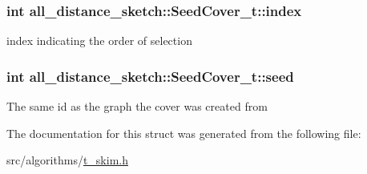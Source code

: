 \subsubsection[{index}]{\setlength{\rightskip}{0pt plus 5cm}int all\+\_\+distance\+\_\+sketch\+::\+Seed\+Cover\+\_\+t\+::index}\label{structall__distance__sketch_1_1SeedCover__t_ac11aa27c1be296bb17310c16790f88f5}
index indicating the order of selection \hypertarget{structall__distance__sketch_1_1SeedCover__t_af8100e6ff9b3830e0b40e395cbaeff4b}{}
\subsubsection[{seed}]{\setlength{\rightskip}{0pt plus 5cm}int all\+\_\+distance\+\_\+sketch\+::\+Seed\+Cover\+\_\+t\+::seed}\label{structall__distance__sketch_1_1SeedCover__t_af8100e6ff9b3830e0b40e395cbaeff4b}
The same id as the graph the cover was created from 

The documentation for this struct was generated from the following file\+:\begin{DoxyCompactItemize}
\item 
src/algorithms/\hyperlink{t__skim_8h}{t\+\_\+skim.\+h}\end{DoxyCompactItemize}
